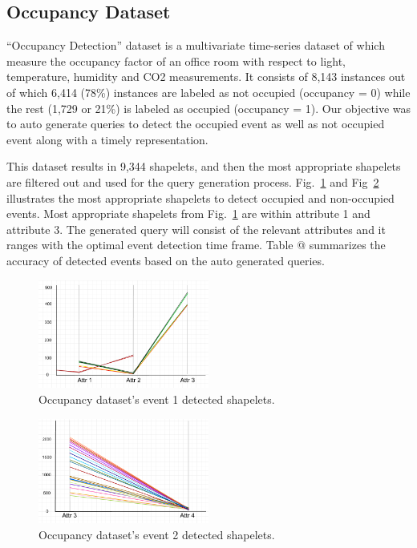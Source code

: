 \documentclass[conference]{IEEEtran}  %
\makeatletter
\newcommand*{\rom}[1]{\expandafter\@slowromancap\romannumeral #1@}
\makeatother
\begin{document}
\subsection{Occupancy Dataset} 
“Occupancy Detection” dataset \cite{IEEEexample:Ocupancy} is a multivariate time-series dataset of which measure the occupancy factor of an office room with respect to light, temperature, humidity and CO2 measurements. It consists of 8,143 instances out of which 6,414 (78\%) instances are labeled as not occupied (occupancy = 0) while the rest (1,729 or 21\%) is labeled as occupied (occupancy = 1). Our objective was to auto generate queries to detect the occupied event as well as not occupied event along with a timely representation.

This dataset results in 9,344 shapelets, and then the most appropriate shapelets are filtered out and used for the query generation process. Fig.~\ref{fig:occupancyEvent1} and Fig~\ref{fig:occupancyEvent2} illustrates the most appropriate shapelets to detect occupied and non-occupied events. Most appropriate shapelets from Fig.~\ref{fig:occupancyEvent1} are within attribute 1 and attribute 3. The generated query will consist of the relevant attributes and it ranges with the optimal event detection time frame. Table \rom{1} summarizes the accuracy of detected events based on the auto generated queries.  


\begin{figure}
\includegraphics[width=0.5\textwidth]{Occupancy_event1.png}
\caption{Occupancy dataset's event 1 detected shapelets.}
\label{fig:occupancyEvent1}
\end{figure}

\begin{figure}
\includegraphics[width=0.5\textwidth]{Occupancy_event2.png}
\caption{Occupancy dataset's event 2 detected shapelets.}
\label{fig:occupancyEvent2}
\end{figure}
\end{document}
